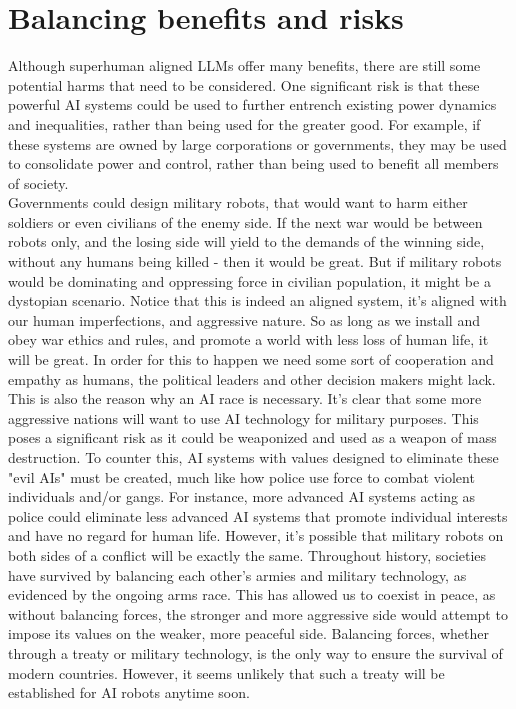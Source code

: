 \documentclass{article}
\begin{document}
\section{Balancing benefits and risks}

Although superhuman aligned LLMs offer many benefits, there are still some potential harms that need to be considered. One significant risk is that these powerful AI systems could be used to further entrench existing power dynamics and inequalities\cite{hightower2019artificial}, rather than being used for the greater good. For example, if these systems are owned by large corporations or governments, they may be used to consolidate power and control, rather than being used to benefit all members of society.\\

Governments could design military robots\cite{swett2021designing}, that would want to harm either soldiers or even civilians of the enemy side. If the next war would be between robots only, and the losing side will yield to the demands of the winning side, without any humans being killed - then it would be great. But if military robots would be dominating and oppressing force in civilian population, it might be a dystopian scenario\cite{vincent2018future}. Notice that this is indeed an aligned system, it's aligned with our human imperfections, and aggressive nature. So as long as we install and obey war ethics and rules, and promote a world with less loss of human life, it will be great. In order for this to happen we need some sort of cooperation and empathy as humans, the political leaders and other decision makers might lack. \\ 

This is also the reason why an AI race is necessary. It's clear that some more aggressive nations will want to use AI technology for military purposes. This poses a significant risk as it could be weaponized and used as a weapon of mass destruction. To counter this, AI systems with values designed to eliminate these "evil AIs" must be created, much like how police use force to combat violent individuals and/or gangs. For instance, more advanced AI systems acting as police could eliminate less advanced AI systems that promote individual interests and have no regard for human life. However, it's possible that military robots on both sides of a conflict will be exactly the same. Throughout history, societies have survived by balancing each other's armies and military technology, as evidenced by the ongoing arms race. This has allowed us to coexist in peace, as without balancing forces, the stronger and more aggressive side would attempt to impose its values on the weaker, more peaceful side. Balancing forces, whether through a treaty or military technology, is the only way to ensure the survival of modern countries. However, it seems unlikely that such a treaty will be established for AI robots anytime soon\cite{vincent2018future}.
\end{document}
